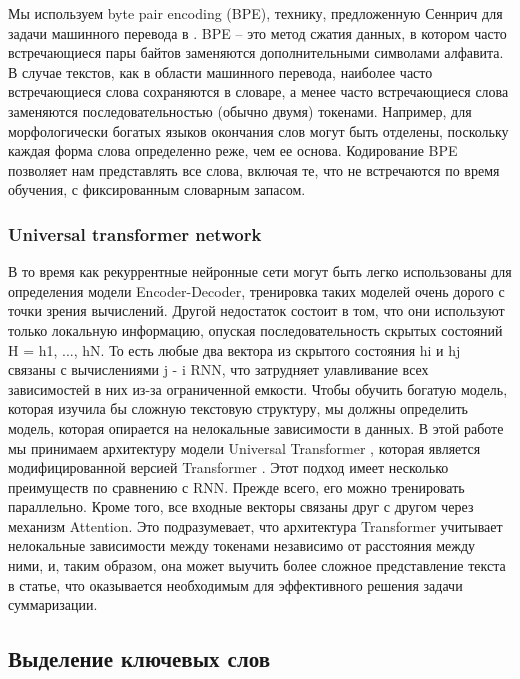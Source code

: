 \documentclass[14pt]{matmex-diploma-custom}
\begin{document}
Мы используем byte pair encoding (BPE), технику, предложенную Сеннрич для задачи машинного перевода в \cite{DBLP:journals/corr/SennrichHB15}. BPE -- это метод сжатия данных, в котором часто встречающиеся пары байтов заменяются дополнительными символами алфавита. В случае текстов, как в области машинного перевода, наиболее часто встречающиеся слова сохраняются в словаре, а менее часто встречающиеся слова заменяются последовательностью (обычно двумя) токенами. Например, для морфологически богатых языков окончания слов могут быть отделены, поскольку каждая форма слова определенно реже, чем ее основа. Кодирование BPE позволяет нам представлять все слова, включая те, что не встречаются по время обучения, с фиксированным словарным запасом.



\subsubsection{Universal transformer network}
В то время как рекуррентные нейронные сети могут быть легко использованы для определения модели Encoder-Decoder, тренировка таких моделей очень дорого с точки зрения вычислений. Другой недостаток состоит в том, что они используют только локальную информацию, опуская последовательность скрытых состояний H = {h1, ..., hN}. То есть любые два вектора из скрытого состояния hi и hj связаны с вычислениями j - i RNN, что затрудняет улавливание всех зависимостей в них из-за ограниченной емкости. Чтобы обучить богатую модель, которая изучила бы сложную текстовую структуру, мы должны определить модель, которая опирается на нелокальные зависимости в данных.
В этой работе мы принимаем архитектуру модели Universal Transformer \cite{}, которая является модифицированной версией Transformer \cite{}. Этот подход имеет несколько преимуществ по сравнению с RNN. Прежде всего, его можно тренировать параллельно. Кроме того, все входные векторы связаны друг с другом через механизм Attention. Это подразумевает, что архитектура Transformer учитывает нелокальные зависимости между токенами независимо от расстояния между ними, и, таким образом, она может выучить более сложное представление текста в статье, что оказывается необходимым для эффективного решения задачи суммаризации.

\subsection{Выделение ключевых слов}
\end{document}

